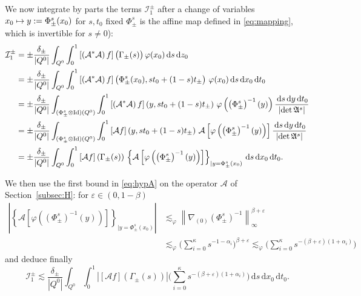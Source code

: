 \documentclass[JEP,XML,SOM,Unicode,NoFloatCountersInSection,published]{cedram}
\newcommand\mto{\mathchoice{\longmapsto}{\mapsto}{\mapsto}{\mapsto}}
\let\epsilon\varepsilon
\theoremstyle{definition}
\newcommand{\cA}{{\mathcal A}}
\newcommand{\cI}{{\mathcal I}}
\newcommand{\I}{\textup{Id}}\let\Id\I
\newcommand{\dd}{{\, \mathrm d}}
\begin{document}
We now integrate by parts the terms $\cI^\pm _1$ after a
change of variables $x_0 \mto y:= \Phi^s_\pm(x_0)$ for
$s,t_0$ fixed $\Phi^s_\pm$ is the affine map defined in \eqref{eq:mapping}, which is invertible for $s
\not =0$):
\begin{equation*}
\begin{aligned}
\cI_1^\pm & = \pm\frac{\delta_\pm}{|Q^0|} \int_{Q^0} \int_0^1
\left[ \left(\mathcal A^* \mathcal A \right) f\right]
\big(\Gamma_\pm(s)\big) \, \varphi(x_0)\dd s\dd z_0 \\
& = \pm\frac{\delta_\pm}{|Q^0|}\int_{Q^0} \int_0^1
\left[ \left(\mathcal A^* \mathcal A \right) f\right]
\left(\Phi^s_\pm (x_0),st_0 + (1-s)t_\pm
\right) \, \varphi(x_0)\dd s\dd x_0 \dd t_0 \\
& = \pm \frac{\delta_\pm}{|Q^0|} \int_{(\Phi^s_\pm \otimes \I)(Q^0)} \int_0^1
\left[ \left(\mathcal A^* \mathcal A \right) f\right]
\left(y,st_0 + (1-s)t_\pm \right) \, \varphi
\left(\left(\Phi^s_\pm\right)^{-1}(y)\right) \frac{\dd s
\dd y \dd t_0}{\left| \det \mathfrak
A^s \right|} \\
& = \pm \frac{\delta_\pm}{|Q^0|} \int_{(\Phi^s_\pm \otimes
\I)(Q^0)} \int_0^1 \left[ \mathcal A f\right]
\left(y,st_0 + (1-s)t_\pm \right) \, \cA\left[\varphi
\left(\left(\Phi^s_\pm \right)^{-1} (y)\right)\right]
\frac{\dd s \dd y \dd t_0}{\left| \det \mathfrak A^s \right|} \\
& = \pm \frac{\delta_\pm}{|Q^0|} \int_{Q^0} \int_0^1
\left[ \mathcal A f\right]
\left(\Gamma_\pm(s) \right) \, \left\{ \cA\left[\varphi
\left(\left(\Phi^s_\pm \right)^{-1} (y)\right)\right]
\right\}_{|y=\Phi^s_\pm(x_0)} \dd s \dd x_0 \dd t_0.
\end{aligned}
\end{equation*}

We then use the first bound in \eqref{eq:hypA} on the operator $\mathcal A$ of Section~\ref{subsec:H}: for $\epsilon \in (0, 1-\beta)$
\begin{align*}
\left| \left\{ \cA\left[\varphi
\left(\left(\Phi^s_\pm \right)^{-1} (y)\right)\right]
\right\}_{|y=\Phi^s_\pm(x_0)} \right|
& \lesssim_\varphi
\left\| \nabla_{(0)} \left(\Phi^s_\pm \right)^{-1}
\right\|_\infty ^{\beta +\epsilon}\\
& \lesssim_\varphi \biggl(\sum_{i=0} ^\kappa s^{-1-\alpha_i}
\biggr)^{\beta +\epsilon} \lesssim_\varphi \biggl(\sum_{i=0} ^\kappa
s^{-(\beta+\epsilon)(1+\alpha_i)} \biggr)
\end{align*}
and deduce finally
\begin{equation*}
\cI_1^\pm \lesssim \frac{\delta_\pm}{|Q^0|} \int_{Q^0} \int_0^1
\left| \left[ \mathcal A f\right]
\left(\Gamma_\pm(s) \right) \right| \biggl(\sum_{i=0}
^\kappa s^{-(\beta+\epsilon)(1+\alpha_i)} \biggr) \dd s \dd x_0 \dd
t_0.
\end{equation*}
\end{document}
